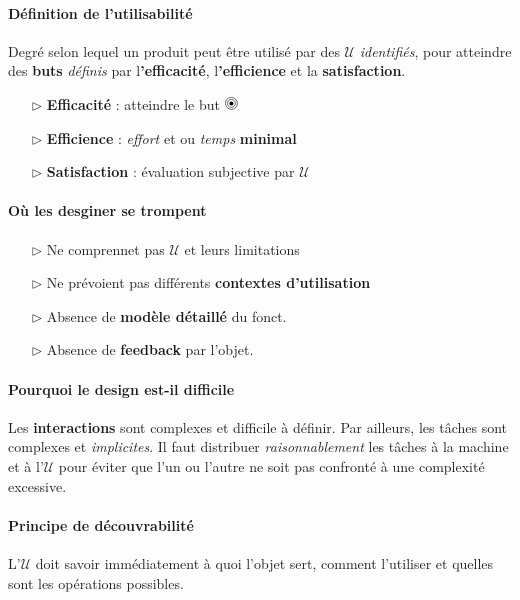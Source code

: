 \documentclass[2pt]{report}
\newcommand{\target}{%
  \begin{tikzpicture}[scale=0.5]
    \fill[black] (0,0) circle (0.1);
    \draw (0,0) circle (0.2);
    \draw (0,0) circle (0.3);
  \end{tikzpicture}%
}
\begin{document}
\begin{multicols*}{3}
    \paragraph{Définition de l'utilisabilité}
    Degré selon lequel un produit peut être utilisé par des 
    $\mathcal{U}$ \textit{identifiés}, pour atteindre des 
    \textbf{buts} \textit{définis} par 
    l\textbf{'efficacité}, l\textbf{'efficience} et 
    la \textbf{satisfaction}.   
    \begin{itemize}
        \item [$\rhd$] \textbf{ Efficacité} : atteindre le but \;  $\target$
        \item[$\rhd$] \textbf{ Efficience} : \textit{effort} 
            et ou \textit{temps} \textbf{minimal} \;  
        \item[$\rhd $] \textbf{ Satisfaction} :  
            évaluation subjective par $\mathcal{U}$
    \end{itemize}

    \paragraph{Où les desginer se trompent}  
    \begin{itemize}
        \item[$\rhd$] Ne comprennet pas $\mathcal{U}$ et leurs limitations
        \item[$\rhd$] Ne prévoient pas différents \textbf{contextes d'utilisation}  
        \item[$\rhd$] Absence de \textbf{modèle détaillé} du fonct.        
        \item[$\rhd$] Absence de \textbf{feedback} par l'objet.        
    \end{itemize}

    \paragraph{Pourquoi le design est-il difficile}
    Les \textbf{interactions} sont complexes et difficile à définir. Par ailleurs, les tâches 
    sont complexes et \textit{implicites}. Il faut distribuer \textit{raisonnablement}
    les tâches à la machine et à l'$\mathcal{U}$ pour éviter que l'un ou l'autre 
    ne soit pas confronté à une complexité excessive. 

    \paragraph{Principe de découvrabilité}
    L'$\mathcal{U}$ doit savoir immédiatement à quoi l'objet sert, comment 
    l'utiliser et quelles sont les opérations possibles. 


\end{multicols*}
\end{document}
